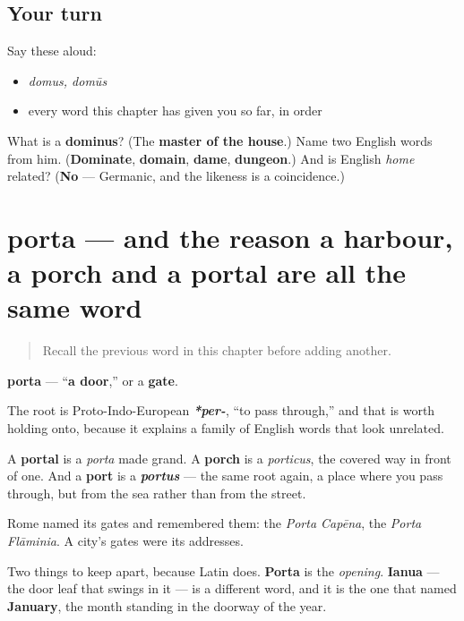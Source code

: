 \subsection*{Your turn}
Say these aloud:

\begin{itemize}
\raggedright
  \item \emph{domus, domūs}
  \item every word this chapter has given you so far, in order
\end{itemize}

\begin{tcolorbox}[breakable,colback=teal!4,colframe=teal!35!black,title={Before you move on}]
What is a \textbf{dominus}? (The \textbf{master of the house}.) Name two English words from him. (\textbf{Dominate}, \textbf{domain}, \textbf{dame}, \textbf{dungeon}.) And is English \emph{home} related? (\textbf{No} — Germanic, and the likeness is a coincidence.)
\end{tcolorbox}
\section[porta, portae]{porta — and the reason a harbour, a porch and a portal are all the same word}

\label{lesson:LA-C44-porta}



\begin{quote}
Recall the previous word in this chapter before adding another.
\end{quote}

\begin{cousinweb}
\textbf{porta} — \textquotedblleft{}\textbf{a door},\textquotedblright{} or a \textbf{gate}.

The root is Proto-Indo-European \emph{\textbf{*per-}}, \textquotedblleft{}to pass through,\textquotedblright{} and that is worth holding onto, because it explains a family of English words that look unrelated.

A \textbf{portal} is a \emph{porta} made grand. A \textbf{porch} is a \emph{porticus}, the covered way in front of one. And a \textbf{port} is a \emph{\textbf{portus}} — the same root again, a place where you pass through, but from the sea rather than from the street.

Rome named its gates and remembered them: the \emph{Porta Capēna}, the \emph{Porta Flāminia}. A city's gates were its addresses.

Two things to keep apart, because Latin does. \textbf{Porta} is the \emph{opening}. \textbf{Ianua} — the door leaf that swings in it — is a different word, and it is the one that named \textbf{January}, the month standing in the doorway of the year.
\end{cousinweb}

